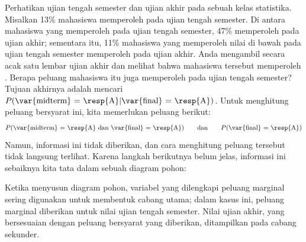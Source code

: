 \begin{examplewrap}
\begin{nexample}{Perhatikan ujian tengah semester dan ujian akhir pada sebuah kelas statistika. Misalkan 13\% mahasiswa memperoleh  pada ujian tengah semester. Di antara mahasiswa yang memperoleh  pada ujian tengah semester, 47\% memperoleh  pada ujian akhir; sementara itu, 11\% mahasiswa yang memperoleh nilai di bawah  pada ujian tengah semester memperoleh  pada ujian akhir. Anda mengambil secara acak satu lembar ujian akhir dan melihat bahwa mahasiswa tersebut memperoleh . Berapa peluang mahasiswa itu juga memperoleh  pada ujian tengah semester?} \label{exerciseForTreeDiagramOfStudentGettingAOnMidtermGivenThatSheGotAOnFinal}
Tujuan akhirnya adalah mencari $P(\text{\var{midterm} = \resp{A}} | \text{\var{final} = \resp{A}})$. Untuk menghitung peluang bersyarat ini, kita memerlukan peluang berikut:
\begin{align*}
P(\text{\var{midterm} = \resp{A} dan \var{final} = \resp{A}})
  \qquad\text{dan}\qquad
  P(\text{\var{final} = \resp{A}})
\end{align*}
Namun, informasi ini tidak diberikan, dan cara menghitung peluang tersebut tidak langsung terlihat. Karena langkah berikutnya belum jelas, informasi ini sebaiknya kita tata dalam sebuah diagram pohon:
\begin{center}
\end{center}
Ketika menyusun diagram pohon, variabel yang dilengkapi peluang marginal sering digunakan untuk membentuk cabang utama; dalam kasus ini, peluang marginal diberikan untuk nilai ujian tengah semester. Nilai ujian akhir, yang bersesuaian dengan peluang bersyarat yang diberikan, ditampilkan pada cabang sekunder.


\end{nexample}
\end{examplewrap}
